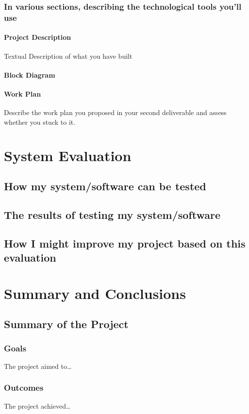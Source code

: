 \documentclass{beamer} %
\begin{document}
\subsection{In various sections, describing the technological tools you'll use}

\begin{frame}
\frametitle{Project Description}
   {Textual Description of what you have built}
\end{frame}

\begin{frame}
\frametitle{Block Diagram}
\end{frame}

\begin{frame}
\frametitle{Work Plan}
Describe the work plan you proposed in your second deliverable and assess whether you stuck to it.
\end{frame}


\chapter{System Evaluation}
\section{How my system/software can be tested}
\section{The results of testing my system/software}
\section{How I might improve my project based on this evaluation}

\chapter{Summary and Conclusions}
\section{Summary of the Project}
\subsection{Goals}
The project aimed to\ldots
\subsection{Outcomes}
The project achieved\ldots
\end{document}

